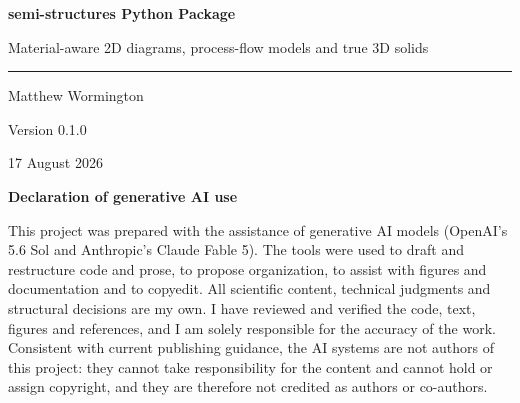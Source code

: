 \documentclass[11pt]{article}
\begin{document}

\begin{titlepage}
  \centering
  \vspace*{1.05in}
  {\color{slate}\LARGE\bfseries semi-structures Python Package\par}
  \vspace{0.22in}
  {\large Material-aware 2D diagrams, process-flow models and true 3D solids\par}
  \vspace{0.65in}
  {\color{slate}\rule{0.55\textwidth}{0.6pt}\par}
  \vspace{0.42in}
  {\large Matthew Wormington\par}
  \vspace{0.10in}
  {\normalsize Version 0.1.0\par}
  \vspace{0.10in}
  {\normalsize 17 August 2026\par}
  \vfill
  \begin{minipage}{0.86\textwidth}
    \scriptsize
    \setlength{\parskip}{0pt}
    \color{slate}
    \begin{center}\textbf{Declaration of generative AI use}\end{center}
    \vspace{0.05in}
    This project was prepared with the assistance of generative AI models
    (OpenAI's 5.6 Sol and Anthropic's Claude Fable 5). The tools were used to
    draft and restructure code and prose, to propose organization, to assist
    with figures and documentation and to copyedit. All scientific content,
    technical judgments and structural decisions are my own. I have reviewed
    and verified the code, text, figures and references, and I am solely
    responsible for the accuracy of the work. Consistent with current
    publishing guidance, the AI systems are not authors of this project: they
    cannot take responsibility for the content and cannot hold or assign
    copyright, and they are therefore not credited as authors or co-authors.
  \end{minipage}


\end{titlepage}
\end{document}
